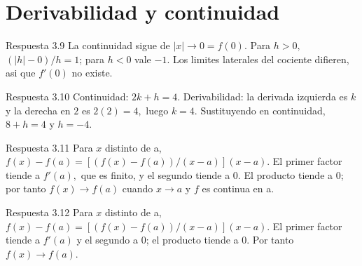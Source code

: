 \documentclass[10pt,a4paper,oneside,openany]{book}
\begin{document}
\section{Derivabilidad y continuidad}
\begin{PSevenAnswerFixed}{Respuesta 3.9}
La continuidad sigue de \(|x|\to 0=f(0)\). Para \(h>0,\) \((|h|-0)/h=1\); para \(h<0\) vale \(-1\). Los limites laterales del cociente difieren, asi que \(f'(0)\) no existe.
\end{PSevenAnswerFixed}
\begin{PSevenAnswerFixed}{Respuesta 3.10}
Continuidad: \(2k+h=4\). Derivabilidad: la derivada izquierda es \(k\) y la derecha en \(2\) es \(2(2)=4,\) luego \(k=4\). Sustituyendo en continuidad, \(8+h=4\) y \(h=-4\).
\end{PSevenAnswerFixed}
\begin{PSevenAnswerFixed}{Respuesta 3.11}
Para \(x\) distinto de a, \(f(x)-f(a)=[(f(x)-f(a))/(x-a)](x-a)\). El primer factor tiende a \(f'(a),\) que es finito, y el segundo tiende a \(0\). El producto tiende a \(0\); por tanto \(f(x)\to f(a)\) cuando \(x\to a\) y \(f\) es continua en a.
\end{PSevenAnswerFixed}
\begin{PSevenAnswerFixed}{Respuesta 3.12}
Para \(x\) distinto de a, \(f(x)-f(a)=[(f(x)-f(a))/(x-a)](x-a)\). El primer factor tiende a \(f'(a)\) y el segundo a \(0\); el producto tiende a \(0\). Por tanto \(f(x)\to f(a)\).
\end{PSevenAnswerFixed}
\end{document}
